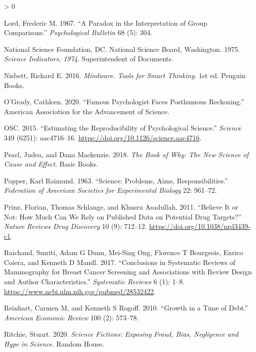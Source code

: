 \documentclass[
  10pt,
  b5paper]{book}
\newlength{\cslhangindent}
\newenvironment{CSLReferences}[2] %
 {%
  \setlength{\parindent}{0pt}
  \ifodd #1 \everypar{\setlength{\hangindent}{\cslhangindent}}\ignorespaces\fi
  \ifnum #2 > 0
  \setlength{\parskip}{#2\baselineskip}
  \fi
 }%
 {}
\begin{document}
\begin{CSLReferences}{1}{0}
\leavevmode\hypertarget{ref-lord1967paradox}{}%
Lord, Frederic M. 1967. {``A Paradox in the Interpretation of Group Comparisons.''} \emph{Psychological Bulletin} 68 (5): 304.

\leavevmode\hypertarget{ref-national1975science}{}%
National Science Foundation, DC. National Science Board, Washington. 1975. \emph{Science Indicators, 1974}. Superintendent of Documents.

\leavevmode\hypertarget{ref-nisbett}{}%
Nisbett, Richard E. 2016. \emph{Mindware. Tools for Smart Thinking.} 1st ed. Penguin Books.

\leavevmode\hypertarget{ref-o2020famous}{}%
O'Grady, Cathleen. 2020. {``Famous Psychologist Faces Posthumous Reckoning.''} American Association for the Advancement of Science.

\leavevmode\hypertarget{ref-osc_EstRep2015}{}%
OSC. 2015. {``Estimating the Reproducibility of Psychological Science.''} \emph{Science} 349 (6251): aac4716--16. \url{https://doi.org/10.1126/science.aac4716}.

\leavevmode\hypertarget{ref-pearl2018book}{}%
Pearl, Judea, and Dana Mackenzie. 2018. \emph{The Book of Why: The New Science of Cause and Effect}. Basic Books.

\leavevmode\hypertarget{ref-popper_1963}{}%
Popper, Karl Raimund. 1963. {``Science: Problems, Aims, Responsibilities.''} \emph{Federation of American Societies for Experimental Biology} 22: 961--72.

\leavevmode\hypertarget{ref-r9_prinz_schlange_asadullah_2011}{}%
Prinz, Florian, Thomas Schlange, and Khusru Asadullah. 2011. {``Believe It or Not: How Much Can We Rely on Published Data on Potential Drug Targets?''} \emph{Nature Reviews Drug Discovery} 10 (9): 712--12. \url{https://doi.org/10.1038/nrd3439-c1}.

\leavevmode\hypertarget{ref-raichand2017conclusions}{}%
Raichand, Smriti, Adam G Dunn, Mei-Sing Ong, Florence T Bourgeois, Enrico Coiera, and Kenneth D Mandl. 2017. {``Conclusions in Systematic Reviews of Mammography for Breast Cancer Screening and Associations with Review Design and Author Characteristics.''} \emph{Systematic Reviews} 6 (1): 1--8. \url{https://www.ncbi.nlm.nih.gov/pubmed/28532422}.

\leavevmode\hypertarget{ref-reinhart2010growth}{}%
Reinhart, Carmen M, and Kenneth S Rogoff. 2010. {``Growth in a Time of Debt.''} \emph{American Economic Review} 100 (2): 573--78.

\leavevmode\hypertarget{ref-ritchie2020science}{}%
Ritchie, Stuart. 2020. \emph{Science Fictions: Exposing Fraud, Bias, Negligence and Hype in Science}. Random House.


\end{CSLReferences}
\end{document}
